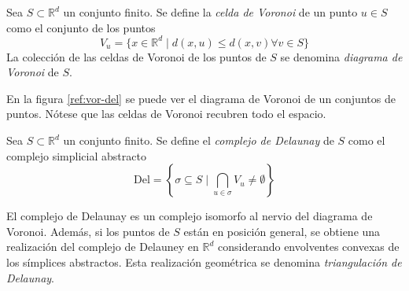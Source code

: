 \begin{definition}
Sea $S \subset \mathbb{R}^d$ un conjunto finito. Se define la \emph{celda de Voronoi} de un punto $u \in S$ como el conjunto de los puntos
\[
V_u = \{ x \in \mathbb{R}^d \mid d(x,u) \leq d(x,v) \forall v \in S\}
\]
La colección de las celdas de Voronoi de los puntos de $S$ se denomina \emph{diagrama de Voronoi} de $S$.
\end{definition}

En la figura \ref{ref:vor-del} se puede ver el diagrama de Voronoi de un conjuntos de puntos. Nótese que las celdas de Voronoi recubren todo el espacio.

\begin{definition}
Sea $S \subset \mathbb{R}^d$ un conjunto finito. Se define el \emph{complejo de Delaunay} de $S$ como el complejo simplicial abstracto 
\[
\text{Del} = \left\{\sigma \subseteq S \mid \bigcap_{u \in \sigma}V_u \neq \emptyset \right\}
\] 
\end{definition}

El complejo de Delaunay es un complejo isomorfo al nervio del diagrama de Voronoi. Además, si los puntos de $S$ están en posición general, se obtiene una realización del complejo de Delauney en $\mathbb{R}^d$ considerando envolventes convexas de los símplices abstractos. Esta realización geométrica se denomina \emph{triangulación de Delaunay}.

